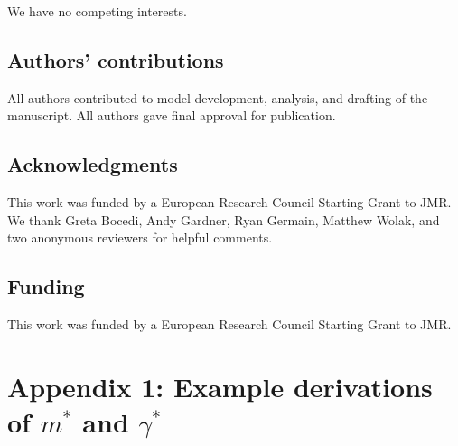 \documentclass[12pt]{article}
\begin{document}
We have no competing interests.

\subsection*{Authors' contributions}

All authors contributed to model development, analysis, and drafting of the manuscript. All authors gave final approval for publication. 

\subsection*{Acknowledgments}

This work was funded by a European Research Council Starting Grant to JMR. We thank Greta Bocedi, Andy Gardner, Ryan Germain, Matthew Wolak, and two anonymous reviewers for helpful comments.

\subsection*{Funding}

This work was funded by a European Research Council Starting Grant to JMR.

\section*{Appendix 1: Example derivations of $m^{*}$ and $\gamma^{*}$}
\end{document}

